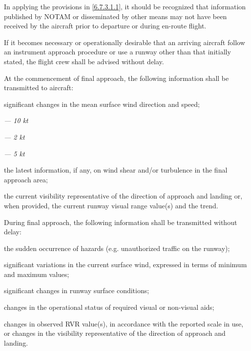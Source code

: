 \begin{enumnoss}
    \item In applying the provisions in \ref{6.7.3.1.1}, it should be recognized that information published by NOTAM or disseminated by other means may not have been received by the aircraft prior to departure or during en-route flight.
    \item If it becomes necessary or operationally desirable that an arriving aircraft follow an instrument approach procedure or use a runway other than that initially stated, the flight crew shall be advised without delay.
    \item At the commencement of final approach, the following information shall be transmitted to aircraft:

    \begin{enumalph}
        \item significant changes in the mean surface wind direction and speed;


        \noindent \textit{--- \quad {}10 kt}

        \noindent \textit{--- \quad {}2 kt}

        \noindent \textit{--- \quad {}5 kt}

        \item the latest information, if any, on wind shear and/or turbulence in the final approach area;
        \item the current visibility representative of the direction of approach and landing or, when provided, the current runway visual range value(s) and the trend.
    \end{enumalph}

    \item During final approach, the following information shall be transmitted without delay:

    \begin{enumalph}
        \item the sudden occurrence of hazards (e.g. unauthorized traffic on the runway);
        \item significant variations in the current surface wind, expressed in terms of minimum and maximum values;
        \item significant changes in runway surface conditions;
        \item changes in the operational status of required visual or non-visual aids;
        \item changes in observed RVR value(s), in accordance with the reported scale in use, or changes in the visibility representative of the direction of approach and landing.
    \end{enumalph}
\end{enumnoss}

